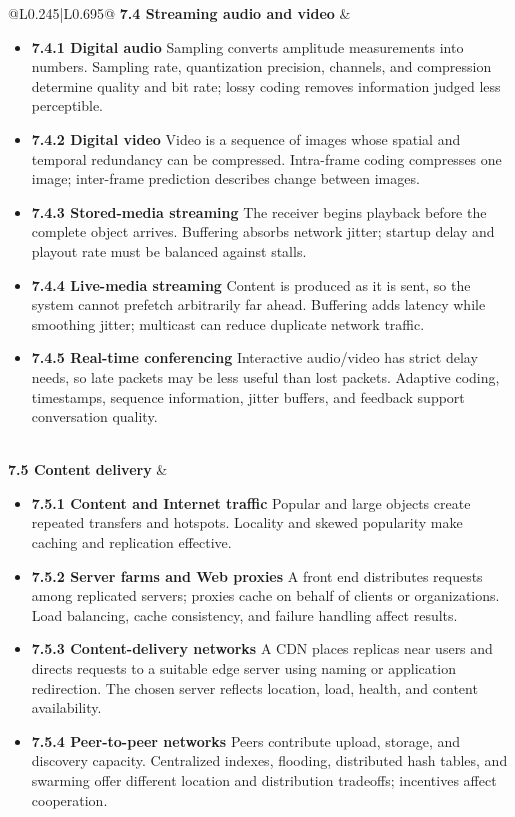 \documentclass[10pt,letterpaper]{article}
\begin{document}
\begin{longtable}{@{}L{0.245\textwidth}|L{0.695\textwidth}@{}}
\textbf{7.4 Streaming audio and video} & \begin{minipage}[t]{\linewidth}\raggedright \begin{itemize}\item \textbf{7.4.1 Digital audio} Sampling converts amplitude measurements into numbers. Sampling rate, quantization precision, channels, and compression determine quality and bit rate; lossy coding removes information judged less perceptible.\item \textbf{7.4.2 Digital video} Video is a sequence of images whose spatial and temporal redundancy can be compressed. Intra-frame coding compresses one image; inter-frame prediction describes change between images.\item \textbf{7.4.3 Stored-media streaming} The receiver begins playback before the complete object arrives. Buffering absorbs network jitter; startup delay and playout rate must be balanced against stalls.\item \textbf{7.4.4 Live-media streaming} Content is produced as it is sent, so the system cannot prefetch arbitrarily far ahead. Buffering adds latency while smoothing jitter; multicast can reduce duplicate network traffic.\item \textbf{7.4.5 Real-time conferencing} Interactive audio/video has strict delay needs, so late packets may be less useful than lost packets. Adaptive coding, timestamps, sequence information, jitter buffers, and feedback support conversation quality.\end{itemize}\end{minipage} \\ \hline
{}\textbf{7.5 Content delivery} & \begin{minipage}[t]{\linewidth}\raggedright \begin{itemize}\item \textbf{7.5.1 Content and Internet traffic} Popular and large objects create repeated transfers and hotspots. Locality and skewed popularity make caching and replication effective.\item \textbf{7.5.2 Server farms and Web proxies} A front end distributes requests among replicated servers; proxies cache on behalf of clients or organizations. Load balancing, cache consistency, and failure handling affect results.\item \textbf{7.5.3 Content-delivery networks} A CDN places replicas near users and directs requests to a suitable edge server using naming or application redirection. The chosen server reflects location, load, health, and content availability.\item \textbf{7.5.4 Peer-to-peer networks} Peers contribute upload, storage, and discovery capacity. Centralized indexes, flooding, distributed hash tables, and swarming offer different location and distribution tradeoffs; incentives affect cooperation.\end{itemize}\end{minipage} \\ \hline

\end{longtable}
\end{document}
